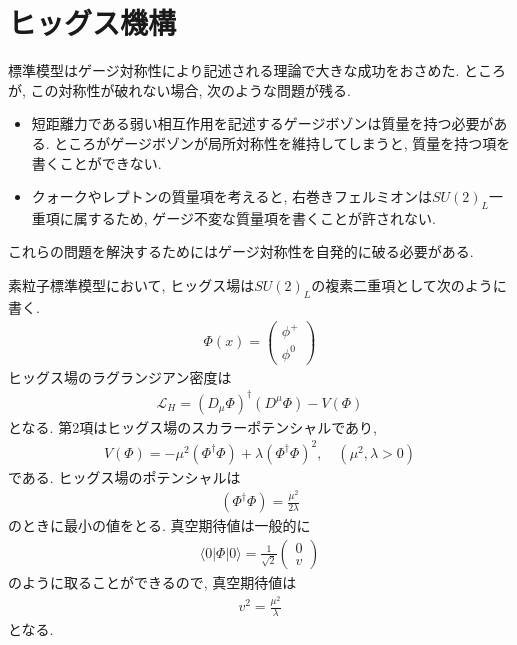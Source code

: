 \section{ヒッグス機構}
標準模型はゲージ対称性により記述される理論で大きな成功をおさめた.
ところが, この対称性が破れない場合, 次のような問題が残る.
\begin{itemize}
  \item 短距離力である弱い相互作用を記述するゲージボゾンは質量を持つ必要がある. ところがゲージボゾンが局所対称性を維持してしまうと, 質量を持つ項を書くことができない.
  \item クォークやレプトンの質量項を考えると, 右巻きフェルミオンは$SU(2)_L$一重項に属するため, ゲージ不変な質量項を書くことが許されない.
\end{itemize}
これらの問題を解決するためにはゲージ対称性を自発的に破る必要がある.

素粒子標準模型において, ヒッグス場は$SU(2)_L$の複素二重項として次のように書く.
\begin{align}
  \Phi(x) = \left(
  \begin{array}{c}
    \phi^+ \\
    \phi^0
  \end{array}
  \right)
\end{align}
ヒッグス場のラグランジアン密度は
\begin{align}
  \mathcal{L}_H = \left(D_\mu \Phi\right)^\dagger (D^\mu \Phi) -V(\Phi) \label{L_H}
\end{align}
となる.
第2項はヒッグス場のスカラーポテンシャルであり,
\begin{align}
  V(\Phi) = -\mu^2 (\Phi^\dagger\Phi)+ {\lambda}(\Phi^\dagger \Phi)^2,\quad(\mu^2, \lambda>0)\label{V_H}
\end{align}
である.
ヒッグス場のポテンシャルは
\begin{align}
  (\Phi^\dagger \Phi) = \frac{\mu^2}{2\lambda}\nonumber
\end{align}
のときに最小の値をとる.
真空期待値は一般的に
\begin{align}
  \langle 0 |\Phi |0\rangle = \frac{1}{\sqrt{2}}\left(\begin{array}{c}
      0 \\
      v
  \end{array}\right)\label{Higgs_VEV}
\end{align}
のように取ることができるので, 真空期待値は
\begin{align}
  v^2 = \frac{\mu^2}{\lambda}\nonumber
\end{align}
となる.

